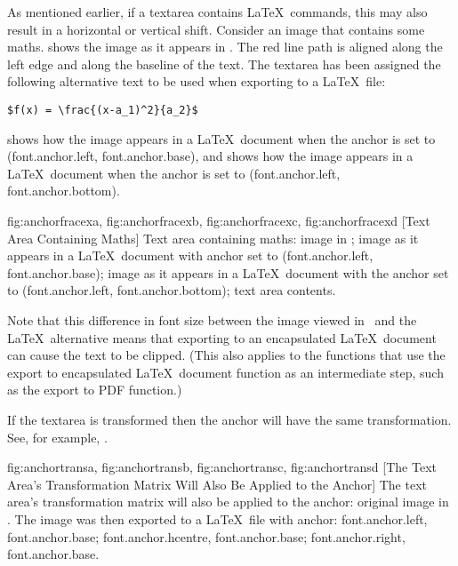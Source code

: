 As mentioned earlier, if a \gls{textarea} contains \LaTeX\ commands,
this may also result in a horizontal or vertical shift. Consider an
image that contains some maths. 
shows the image as it appears in \FlowframTk. The red line path is
aligned along the left edge and along the baseline of the text.  The
\gls*{textarea} has been assigned the following alternative text to be
used when exporting to a \LaTeX\ file:
\begin{verbatim}
$f(x) = \frac{(x-a_1)^2}{a_2}$
\end{verbatim}
 shows how the image appears
in a \LaTeX\ document when the anchor is set to
(\gls{font.anchor.left}, \gls{font.anchor.base}),
and  shows how the image appears
in a \LaTeX\ document when the anchor is set to 
(\gls{font.anchor.left}, \gls{font.anchor.bottom}).

{
  {fig:anchorfracexa}{}{},
  {fig:anchorfracexb}{}{},
  {fig:anchorfracexc}{}{},
  {fig:anchorfracexd}{}{}
}
[Text Area Containing Maths]
{Text area containing maths:
 image in \FlowframTk;
 image as it appears in a
\LaTeX\ document with anchor set to 
(\gls{font.anchor.left}, \gls{font.anchor.base});
 image
as it appears in a \LaTeX\ document with the anchor set to
(\gls{font.anchor.left}, \gls{font.anchor.bottom});
 text area contents.}

\begin{warning}
Note that this difference in font size between the image
viewed in \FlowframTk\ and the \LaTeX\ alternative means that
exporting to an encapsulated \LaTeX\ document can cause the text to
be clipped. (This also applies to the  functions that use the
export to encapsulated \LaTeX\ document function as an intermediate
step, such as the export to PDF function.)
\end{warning}

If the \gls*{textarea} is transformed then the anchor will
have the same transformation. See, for example,
.

{
  {fig:anchortransa}{}{},
  {fig:anchortransb}{}{},
  {fig:anchortransc}{}{},
  {fig:anchortransd}{}{}
}
[The Text Area's Transformation Matrix Will Also Be Applied to the Anchor]
{The text area's transformation matrix will
also be applied to the anchor:
 original image in
\FlowframTk.  The image was then exported to a \LaTeX\ file with
anchor:
 \gls{font.anchor.left},
\gls{font.anchor.base};
 \gls{font.anchor.hcentre},
\gls{font.anchor.base};
\gls{font.anchor.right}, \gls{font.anchor.base}.}

